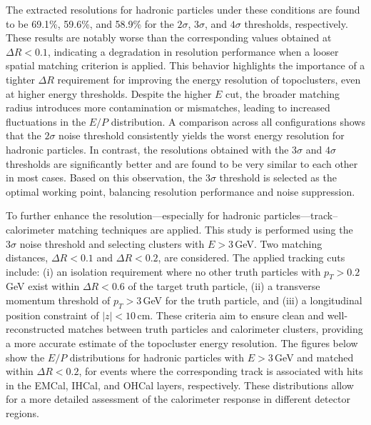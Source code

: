 The extracted resolutions for hadronic particles under these conditions are found to be 69.1\%, 59.6\%, and 58.9\% for the $2\sigma$, $3\sigma$, and $4\sigma$ thresholds, respectively. These results are notably worse than the corresponding values obtained at $\Delta R < 0.1$, indicating a degradation in resolution performance when a looser spatial matching criterion is applied. This behavior highlights the importance of a tighter $\Delta R$ requirement for improving the energy resolution of topoclusters, even at higher energy thresholds. Despite the higher $E$ cut, the broader matching radius introduces more contamination or mismatches, leading to increased fluctuations in the $E/P$ distribution.
A comparison across all configurations shows that the $2\sigma$ noise threshold consistently yields the worst energy resolution for hadronic particles. In contrast, the resolutions obtained with the $3\sigma$ and $4\sigma$ thresholds are significantly better and are found to be very similar to each other in most cases. Based on this observation, the $3\sigma$ threshold is selected as the optimal working point, balancing resolution performance and noise suppression.

To further enhance the resolution—especially for hadronic particles—track–calorimeter matching techniques are applied. This study is performed using the $3\sigma$ noise threshold and selecting clusters with $E > 3$\,GeV. Two matching distances, $\Delta R < 0.1$ and $\Delta R < 0.2$, are considered. The applied tracking cuts include:  
(i) an isolation requirement where no other truth particles with $p_T > 0.2$\,GeV exist within $\Delta R < 0.6$ of the target truth particle,  
(ii) a transverse momentum threshold of $p_T > 3$\,GeV for the truth particle, and  
(iii) a longitudinal position constraint of $|z| < 10$\,cm.  
These criteria aim to ensure clean and well-reconstructed matches between truth particles and calorimeter clusters, providing a more accurate estimate of the topocluster energy resolution.
The figures below show the $E/P$ distributions for hadronic particles with $E > 3$\,GeV and matched within $\Delta R < 0.2$, for events where the corresponding track is associated with hits in the EMCal, IHCal, and OHCal layers, respectively. These distributions allow for a more detailed assessment of the calorimeter response in different detector regions.

